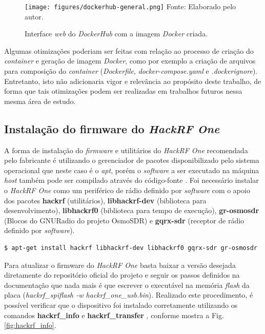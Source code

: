 \documentclass[
  12pt,				%
  openright,			%
  twoside,			%
  a4paper,			%
  english,			%
  french,				%
  spanish,			%
  brazil,				%
  ]{abntex2}
\begin{document}
\begin{figure}[!htb]
  \centering
  \caption{Interface \textit{web} do \textit{DockerHub} com a imagem \textit{Docker} criada.}
  \texttt{[image: figures/dockerhub-general.png]}
  Fonte: Elaborado pelo autor.
  \label{fig:dockerhub-general}
\end{figure}

Algumas otimizações poderiam ser feitas com relação ao processo de criação do \textit{container} e geração de imagem \textit{Docker}, como por exemplo a criação
de arquivos para composição do \textit{container} (\textit{Dockerfile}, \textit{docker-compose.yaml} e \textit{.dockerignore}). Entretanto, isto
não adicionaria vigor e relevância ao propósito deste trabalho, de forma que tais otimizações podem ser realizadas em trabalhos futuros nessa mesma
área de estudo.

\subsection*{Instalação do firmware do \textit{HackRF One}}

A forma de instalação do \textit{firmware} e utilitários do \textit{HackRF One} recomendada pelo fabricante é utilizando o gerenciador de pacotes disponibilizado pelo
sistema operacional que neste caso é o \textit{apt}, porém o \textit{software} a ser executado na máquina \textit{host} também pode ser compilado através do código-fonte \cite{HACKRF-build-host-software}. Foi necessário instalar o \textit{HackRF One} como um periférico de rádio definido por \textit{software} com o
apoio dos pacotes \textbf{hackrf} (utilitários), \textbf{libhackrf-dev} (biblioteca para desenvolvimento), \textbf{libhackrf0} (biblioteca para tempo de execução),
\textbf{gr-osmosdr} (Blocos do GNURadio do projeto OsmoSDR) e \textbf{gqrx-sdr} (receptor de rádio definido por \textit{software}).

\begin{adjustbox}{max width=\linewidth}
  \begin{lstlisting}[language=bash]
  $ apt-get install hackrf libhackrf-dev libhackrf0 gqrx-sdr gr-osmosdr
\end{lstlisting}
\end{adjustbox}

Para atualizar o firmware do \textit{HackRF One} basta baixar a versão desejada diretamente do repositório oficial do projeto e seguir os passos
definidos na documentação \cite{HACKRF-updating-firmware} que nada mais é que escrever o executável na memória \textit{flash} da placa (\textit{hackrf\_spiflash -w hackrf\_one\_usb.bin}).
Realizado este procedimento, é possível verificar que o dispositivo foi instalado corretamente utilizando os comandos \textbf{hackrf\_info} e \textbf{hackrf\_transfer} \cite{HACKRF-tools}, conforme mostra a Fig. \ref{fig:hackrf_info}.
\end{document}
